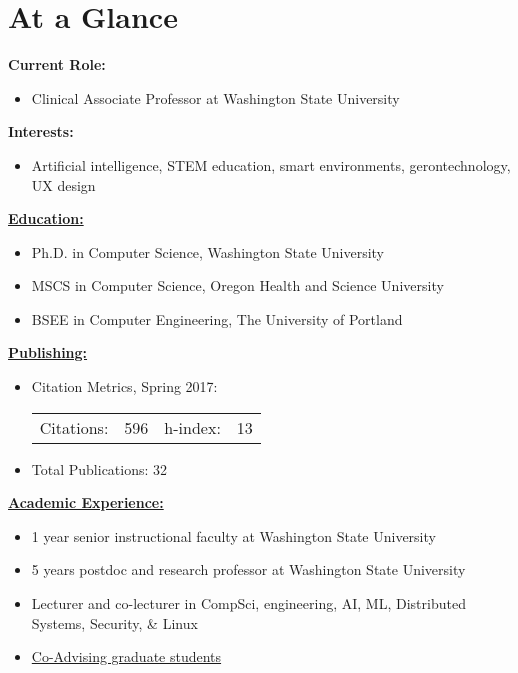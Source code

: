 \section*{At a Glance}


{\bf Current Role:}
\begin{itemize}
	\item Clinical Associate Professor at Washington State University
\end{itemize}

{\bf Interests:}
\begin{itemize}
	\item Artificial intelligence, STEM education, smart environments, gerontechnology, UX design
\end{itemize}

{\bf \hyperref[sec:education]{Education:}}
\begin{itemize}
	\item Ph.D. in Computer Science, Washington State University
	\item MSCS in Computer Science, Oregon Health and Science University
	\item BSEE in Computer Engineering, The University of Portland
\end{itemize}

{\bf \hyperref[sec:publications]{Publishing:}}
\begin{itemize}
	\item Citation Metrics, Spring 2017:
\begin{tabular}{l c || l r}
Citations: & 596 & h-index:  & 13 \\ %
\end{tabular}
	\item Total Publications: 32
\end{itemize}

{\bf \hyperref[sec:teachingexperience]{Academic Experience:}}
\begin{itemize}
	\item 1 year senior instructional faculty at Washington State University
	\item 5 years postdoc and research professor at Washington State University
	\item Lecturer and co-lecturer in CompSci, engineering, AI, ML, Distributed Systems, Security, \& Linux
	\item \hyperref[sec:students]{Co-Advising graduate students}
\end{itemize}

